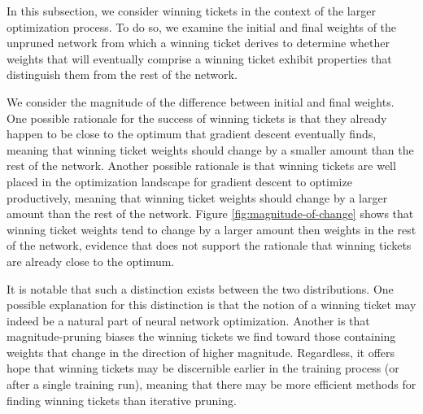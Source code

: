 In this subsection, we consider winning tickets in the context of the larger optimization process. To do so, we examine the initial and final weights of the unpruned network
from which a winning ticket derives to determine whether weights that will eventually comprise a winning ticket exhibit properties that distinguish them from the rest
of the network.

We consider the magnitude of the difference between initial and final weights. One possible rationale for the success of winning tickets is that they already
happen to be close to the optimum that gradient descent eventually finds, meaning that winning ticket weights
should change by a smaller amount than the rest of the network. Another
possible rationale is that winning tickets are well placed in the optimization landscape for gradient descent to optimize productively, meaning that winning ticket weights
should change by a larger amount than the rest of the network. Figure \ref{fig:magnitude-of-change} shows that winning ticket weights tend to change by a larger amount
then weights in the rest of the network, evidence that does not support the rationale that winning tickets are already close to the optimum.

It is notable that such a
distinction exists between the two distributions. One possible explanation for this distinction is that the notion of a winning
ticket may indeed be a natural part of neural network optimization. Another is that magnitude-pruning biases the winning tickets we find toward those
containing weights that change in the direction of higher magnitude.
Regardless, it offers hope that winning tickets may be discernible earlier in the training process (or after
a single training run), meaning that there may be more efficient methods for finding winning
tickets than iterative pruning.

